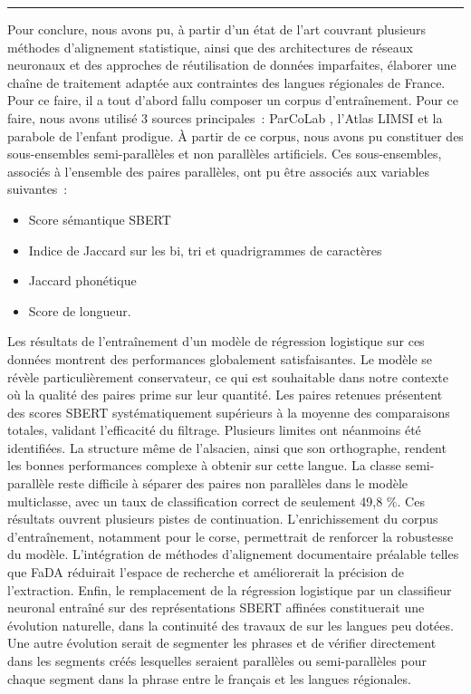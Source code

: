 \noindent\rule{\textwidth}{0.4pt}

Pour conclure, nous avons pu, à partir d'un état de l'art couvrant plusieurs méthodes d'alignement statistique,
ainsi que des architectures de réseaux neuronaux et des approches de réutilisation de données imparfaites, élaborer une chaîne de 
traitement adaptée aux contraintes des langues régionales de France. Pour ce faire, il a tout d'abord fallu composer un corpus d'entraînement.
Pour ce faire, nous avons utilisé 3 sources principales~: ParCoLab \citep{stosic_2024}, 
l'Atlas LIMSI et la parabole de l'enfant prodigue. À partir de ce corpus, nous avons pu constituer des sous-ensembles semi-parallèles et
non parallèles artificiels. Ces sous-ensembles, associés à l'ensemble des paires parallèles, ont pu être associés aux variables suivantes~:
\begin{itemize}
    \item Score sémantique SBERT
    \item Indice de Jaccard sur les bi, tri et quadrigrammes de caractères
    \item Jaccard phonétique
    \item Score de longueur.
\end{itemize}

Les résultats de l'entraînement d'un modèle de régression logistique sur ces données montrent des performances globalement satisfaisantes.
Le modèle se révèle particulièrement conservateur, ce qui est souhaitable dans notre
contexte où la qualité des paires prime sur leur quantité. Les paires retenues
présentent des scores SBERT systématiquement supérieurs à la moyenne des comparaisons totales, validant l'efficacité du filtrage.
Plusieurs limites ont néanmoins été identifiées. La structure même de l'alsacien, ainsi que son orthographe, rendent les bonnes performances
complexe à obtenir sur cette langue. La classe semi-parallèle reste difficile à séparer des paires non parallèles dans le modèle
multiclasse, avec un taux de classification correct de seulement 49,8 \%.
Ces résultats ouvrent plusieurs pistes de continuation. L'enrichissement du corpus d'entraînement, notamment pour le corse, permettrait de
renforcer la robustesse du modèle. L'intégration de méthodes d'alignement documentaire préalable telles que FaDA \citep{tsolakis_2024}
réduirait l'espace de recherche
et améliorerait la précision de l'extraction. Enfin, le remplacement de la régression logistique par un classifieur neuronal entraîné sur des
représentations SBERT affinées constituerait une évolution naturelle, dans la continuité des travaux de \citet{tan_2022} sur les
langues peu dotées. Une autre évolution serait de segmenter les phrases et de vérifier directement dans les segments créés lesquelles seraient
parallèles ou semi-parallèles pour chaque segment dans la phrase entre le français et les langues régionales.